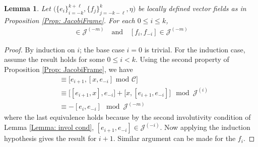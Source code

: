 \documentclass[11pt,letterpaper]{amsart}
\newtheorem{lemma}[theorem]{Lemma}
\numberwithin{equation}{section}
\begin{document}
\begin{lemma}
    \label{Lemma: [e_i,e_-i]}
    Let $\big(\{e_i\}_{i=-k}^{k+\ell},\{f_j\}_{j=-k-\ell}^k,\eta\big)$ be locally defined vector fields as in Proposition \ref{Prop: JacobiFrame}. For each $0\leq i \leq k$,
    \begin{gather}
        [e_{i},e_{-i}]\in \mathcal{J}^{(-m)}\quad\text{and}\quad [f_{i},f_{-i}]\in \mathcal{J}^{(-m)}
    \end{gather}
\end{lemma}
\begin{proof}
    By induction on $i$; the base case $i=0$ is trivial. For the induction case, assume the result holds for some $0\leq i <k$. Using the second property of Proposition \ref{Prop: JacobiFrame}, we have
    \begin{align}
        [e_{i+1},e_{-i-1}] &\equiv \big[e_{i+1},[x,e_{-i}]\text{ mod } \mathcal C\big] 
        \\
        &\equiv \big[[e_{i+1},x],e_{-i}\big] + \big[x,[e_{i+1},e_{-i}]\big] \mod \mathcal{J}^{(i)}\\
        &\equiv -[e_{i}, e_{-i}] \mod \mathcal{J}^{(-m)}
    \end{align}
    where the last equivalence holds because by the second involutivity condition of Lemma \ref{Lemma: invol cond}, $[e_{i+1},e_{-i}]\in \mathcal{J}^{(-i)}$. Now applying the induction hypothesis gives the result for $i+1$. Similar argument can be made for the $f_i$.
\end{proof}
\end{document}
